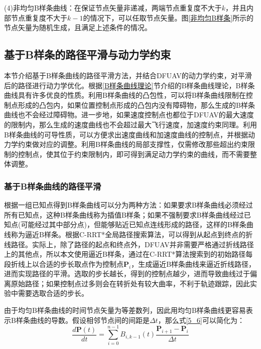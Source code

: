 (4)非均匀B样条曲线：在保证节点矢量非递减，两端节点重复度不大于$k$，并且内部节点重复度不大于$k-1$的情况下，可以任取节点矢量。图\ref{非均匀B样条}所示的节点矢量为随机生成，且满足上述条件的情况。



\subsection{基于B样条的路径平滑与动力学约束}

本节介绍基于B样条曲线的路径平滑方法，并结合DFUAV的动力学约束，对平滑后的路径进行动力学优化。根据\ref{B样条曲线理论}节介绍的B样条曲线理论，B样条曲线具有许多优良的性质。利用B样条曲线的凸包性，可以将B样条曲线限制在控制点形成的凸包内，如果位置控制点形成的凸包内没有障碍物，那么生成的B样条曲线也不会经过障碍物。进一步地，如果速度控制点也都位于DFUAV的最大速度的限制内，那么生成的速度曲线也不会超过最大飞行速度，加速度约束同理。利用B样条曲线的可导性质，可以方便求出速度曲线和加速度曲线的控制点，并根据动力学约束做对应的调整。利用B样条曲线的局部支撑性，仅需修改那些超出约束限制的控制点，使其位于约束限制内，即可得到满足动力学约束的曲线，而不需要整体调整。

\subsubsection{基于B样条曲线的路径平滑}\label{基于B样条曲线的路径平滑}

根据一组已知点得到B样条曲线可以分为两种方法：如果要求B样条曲线必须经过所有已知点，这种B样条曲线称为插值B样条；如果不强制要求B样条曲线经过已知点(可能经过其中部分点)，但能够贴近已知点连线形成的路径，这样的B样条曲线称为逼近B样条。根据C-RRT*全局路径搜索算法，可以得到从起点到终点的折线路径。实际上，除了路径的起点和终点外，DFUAV并非需要严格通过折线路径上的其他点，所以本文使用逼近B样条，通过在C-RRT*算法搜索到的初始路径每段折线上以合适的步长取点作为控制点$\boldsymbol{P}_i$，生成逼近B样条曲线来逼近折线路径，进而实现路径的平滑。选取的步长越长，得到的控制点越少，进而导致曲线过于偏离原始路径；如果控制点过多则会在转折处有较大曲率，不利于轨迹跟踪，因此实验中需要选取合适的步长。

由于均匀B样条曲线的时间节点矢量为等差数列，因此用均匀B样条曲线更容易表示B样条曲线的导数。假设相邻节点间的间距是$\Delta t$，那么式\eqref{5_6}可以简化为：
\begin{equation}
        \frac{d\boldsymbol{P}(t)}{dt} =\sum_{i=0}^{n-1}B_{i,k-1}(t)\frac{\boldsymbol{P}_{i+1}-\boldsymbol{P}_{i}}{\Delta t}
    \label{5_8}
\end{equation}

